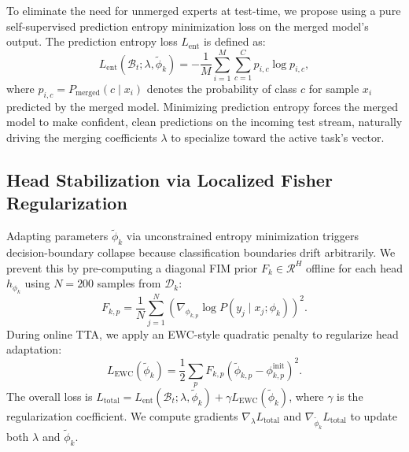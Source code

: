 \documentclass{article}
\theoremstyle{plain}
\theoremstyle{definition}
\theoremstyle{remark}
\begin{document}
To eliminate the need for unmerged experts at test-time, we propose using a pure self-supervised prediction entropy minimization loss on the merged model's output. The prediction entropy loss $L_{\text{ent}}$ is defined as:
\begin{equation}
    L_{\text{ent}}(\mathcal{B}_t; \lambda, \tilde{\phi}_k) = -\frac{1}{M}\sum_{i=1}^M \sum_{c=1}^C p_{i,c} \log p_{i,c},
\end{equation}
where $p_{i,c} = P_{\text{merged}}(c \mid x_i)$ denotes the probability of class $c$ for sample $x_i$ predicted by the merged model.
Minimizing prediction entropy forces the merged model to make confident, clean predictions on the incoming test stream, naturally driving the merging coefficients $\lambda$ to specialize toward the active task's vector.

\subsection{Head Stabilization via Localized Fisher Regularization}
Adapting parameters $\tilde{\phi}_k$ via unconstrained entropy minimization triggers decision-boundary collapse because classification boundaries drift arbitrarily. We prevent this by pre-computing a diagonal FIM prior $F_k \in \mathcal{R}^H$ offline for each head $h_{\phi_k}$ using $N=200$ samples from $\mathcal{D}_k$:
\begin{equation}
    F_{k,p} = \frac{1}{N}\sum_{j=1}^N \left( \nabla_{\phi_{k,p}} \log P(y_j \mid x_j; \phi_k) \right)^2.
\end{equation}
During online TTA, we apply an EWC-style quadratic penalty to regularize head adaptation:
\begin{equation}
    L_{\text{EWC}}(\tilde{\phi}_k) = \frac{1}{2}\sum_p F_{k,p} \left( \tilde{\phi}_{k,p} - \phi_{k,p}^{\text{init}} \right)^2.
\end{equation}
The overall loss is $L_{\text{total}} = L_{\text{ent}}(\mathcal{B}_t; \lambda, \tilde{\phi}_k) + \gamma L_{\text{EWC}}(\tilde{\phi}_k)$, where $\gamma$ is the regularization coefficient. We compute gradients $\nabla_{\lambda} L_{\text{total}}$ and $\nabla_{\tilde{\phi}_k} L_{\text{total}}$ to update both $\lambda$ and $\tilde{\phi}_k$.
\end{document}
